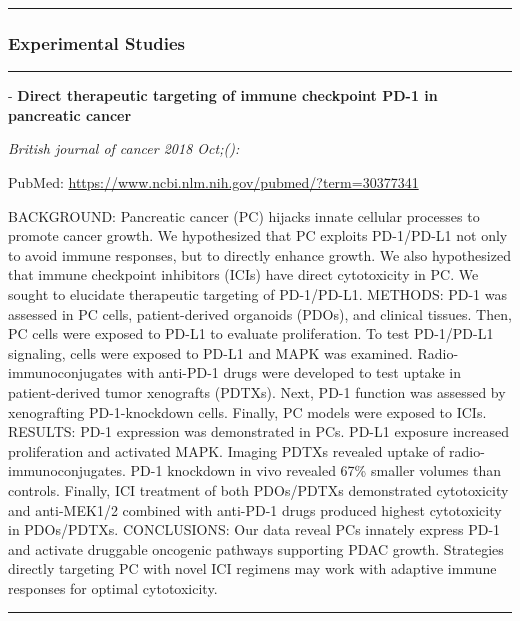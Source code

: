\documentclass[]{article}
\begin{document}
\begin{center}\rule{0.5\linewidth}{\linethickness}\end{center}

\hypertarget{experimental-studies}{%
\subsubsection{Experimental Studies}\label{experimental-studies}}

\begin{center}\rule{0.5\linewidth}{\linethickness}\end{center}

 - \textbf{Direct therapeutic targeting of immune checkpoint PD-1 in
pancreatic cancer}

\emph{British journal of cancer 2018 Oct;():}

PubMed: \url{https://www.ncbi.nlm.nih.gov/pubmed/?term=30377341}

BACKGROUND: Pancreatic cancer (PC) hijacks innate cellular processes to
promote cancer growth. We hypothesized that PC exploits PD-1/PD-L1 not
only to avoid immune responses, but to directly enhance growth. We also
hypothesized that immune checkpoint inhibitors (ICIs) have direct
cytotoxicity in PC. We sought to elucidate therapeutic targeting of
PD-1/PD-L1. METHODS: PD-1 was assessed in PC cells, patient-derived
organoids (PDOs), and clinical tissues. Then, PC cells were exposed to
PD-L1 to evaluate proliferation. To test PD-1/PD-L1 signaling, cells
were exposed to PD-L1 and MAPK was examined. Radio-immunoconjugates with
anti-PD-1 drugs were developed to test uptake in patient-derived tumor
xenografts (PDTXs). Next, PD-1 function was assessed by xenografting
PD-1-knockdown cells. Finally, PC models were exposed to ICIs. RESULTS:
PD-1 expression was demonstrated in PCs. PD-L1 exposure increased
proliferation and activated MAPK. Imaging PDTXs revealed uptake of
radio-immunoconjugates. PD-1 knockdown in vivo revealed 67\% smaller
volumes than controls. Finally, ICI treatment of both PDOs/PDTXs
demonstrated cytotoxicity and anti-MEK1/2 combined with anti-PD-1 drugs
produced highest cytotoxicity in PDOs/PDTXs. CONCLUSIONS: Our data
reveal PCs innately express PD-1 and activate druggable oncogenic
pathways supporting PDAC growth. Strategies directly targeting PC with
novel ICI regimens may work with adaptive immune responses for optimal
cytotoxicity.

{}

{}

\begin{center}\rule{0.5\linewidth}{\linethickness}\end{center}
\end{document}
